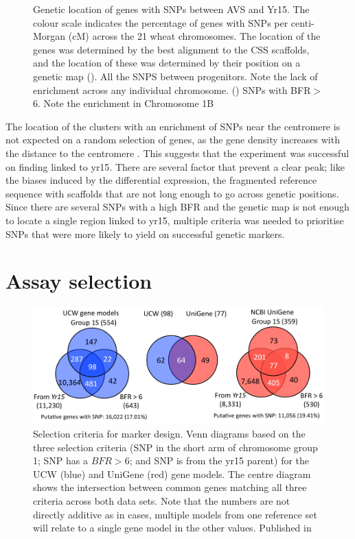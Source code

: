 \begin{figure}
\begin{subfigure}{0.45\textwidth}
	\end{subfigure}
	\caption{Genetic location of genes with SNPs between AVS and Yr15. The colour scale indicates the percentage of genes with SNPs per centi-Morgan (cM) across the 21 wheat chromosomes. The location of the genes was determined by the best alignment to the CSS scaffolds, and the location of these was determined by their position on a genetic map \citep{Wang2014} (). All the SNPS between progenitors. Note the lack of enrichment across any individual chromosome. () SNPs with BFR$>$6. Note the enrichment in Chromosome 1B }
	\label{fig:yr15:bfrs:0-6}
\end{figure}

The location of the clusters with an enrichment of SNPs near the centromere is not expected on a random selection of genes, as the gene density increases with the distance to the centromere \citep{Akhunov2003}. 
This suggests that the experiment was successful on finding  linked to \acrshort{yr15}. 
There are several factor that prevent a clear peak; like the biases induced by the differential expression, the fragmented reference sequence with scaffolds that are not long enough to go across genetic positions. 
Since there are several SNPs with a high BFR and the genetic map is not enough to locate a single region linked to \acrshort{yr15},  multiple criteria was needed to prioritise SNPs that were more likely to yield on successful genetic markers.

\section{Assay selection} 
\label{yr15:assaySelection}
\begin{figure}
\centering
\includegraphics[width=1\textwidth]{Yr15/Figures/selection/snpSets.pdf}
\caption{Selection criteria for marker design. Venn diagrams based on the three selection criteria (SNP in the short arm of chromosome group 1; SNP has a $BFR>6$; and SNP is from the \acrshort{yr15} parent) for the UCW (blue) and UniGene (red) gene models. The centre diagram shows the intersection between common genes matching all three criteria across both data sets. Note that the numbers are not directly additive as in cases, multiple models from one reference set will relate to a single gene model in the other values. Published in \citep{Ramirez-Gonzalez2015b} }
\label{fig:yr15:snpset}
\end{figure}

